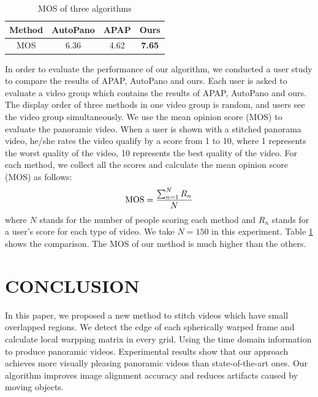 \documentclass[conference]{IEEEtran}
\begin{document}
\begin{table}[t]
\caption{MOS of three algorithms}
\label{tab1:table1}
\centering
\begin{tabular}{c|c|c|c}
\hline
Method& AutoPano& APAP& Ours\\
\hline
MOS& 6.36& 4.62& \bf{7.65}\\
\hline
\end{tabular}
\end{table}
In order to evaluate the performance of our algorithm, we conducted a user study to compare the results of APAP, AutoPano and ours. 
Each user is asked to evaluate a video group which contains the results of APAP, AutoPano and ours. 
The display order of three methods in one video group is random, and users see the video group simultaneously.
We use the mean opinion score (MOS) to evaluate the panoramic video. When a user is shown with a stitched panorama video, he/she rates the video qualify by a score from 1 to 10, where
1 represents the worst quality of the video, 10 represents the best quality of the video. For each method, we collect all the scores and calculate the mean opinion score (MOS) as 
follows:
\begin{equation}
{\rm MOS}=\frac{\sum^{N}_{n=1}{R_n}}{N}
\end{equation}
where $N$ stands for the number of people scoring each method and $R_n$ stands for a user's score for each type of video. We take $N=150$ in this experiment.
Table \ref{tab1:table1} shows the comparison. The MOS of our method is much higher than the others.

\section{CONCLUSION}
\label{sec:conclusion}

In this paper, we proposed a new method to stitch videos which have small overlapped regions.
We detect the edge of each spherically warped frame and calculate local warpping matrix in every grid. Using the time domain information to produce panoramic videos. 
Experimental results show that our approach achieves more visually pleasing panoramic videos than state-of-the-art ones. Our algorithm improves image alignment accuracy and reduces artifacts caused by
moving objects.
\end{document}

